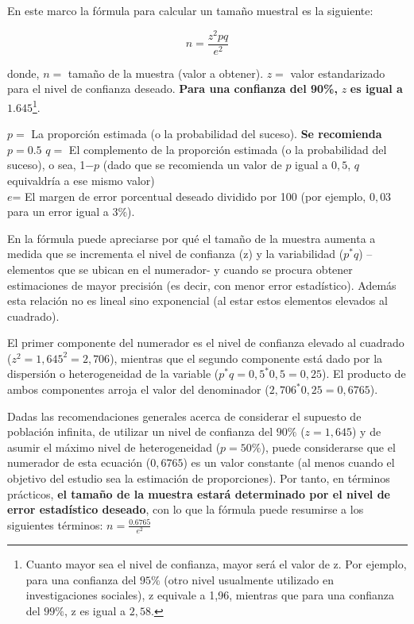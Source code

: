\documentclass[
]{book}
\begin{document}
En este marco la fórmula para calcular un tamaño muestral es la siguiente:

\[n = \frac{z^2pq}{e^2}\]

donde, \(n=\) tamaño de la muestra (valor a obtener). \(z=\) valor estandarizado para el nivel de confianza deseado. \textbf{Para una confianza del 90\%,} \(z\) \textbf{es igual a} \(1.645\)\footnote{Cuanto mayor sea el nivel de confianza, mayor será el valor de z. Por ejemplo, para una confianza del \(95\%\) (otro nivel usualmente utilizado en investigaciones sociales), z equivale a 1,96, mientras que para una confianza del \(99\%\), z es igual a \(2,58\).}.

\(p=\) La proporción estimada (o la probabilidad del suceso). \textbf{Se recomienda} \(p=0.5\) \(q=\) El complemento de la proporción estimada (o la probabilidad del suceso), o sea, 1\(-p\) (dado que se recomienda un valor de \(p\) igual a \(0,5\), \(q\) equivaldría a ese mismo valor)\\
\(e\)= El margen de error porcentual deseado dividido por 100 (por ejemplo, \(0,03\) para un error igual a \(3\%\)).

\hfill\break
En la fórmula puede apreciarse por qué el tamaño de la muestra aumenta a medida que se incrementa el nivel de confianza (z) y la variabilidad (\(p^*q\)) --elementos que se ubican en el numerador- y cuando se procura obtener estimaciones de mayor precisión (es decir, con menor error estadístico). Además esta relación no es lineal sino exponencial (al estar estos elementos elevados al cuadrado).

El primer componente del numerador es el nivel de confianza elevado al cuadrado (\(z^2=1,645^2=2,706\)), mientras que el segundo componente está dado por la dispersión o heterogeneidad de la variable (\(p^*q=0,5^*0,5=0,25\)). El producto de ambos componentes arroja el valor del denominador (\(2,706^*0,25=0,6765\)).

Dadas las recomendaciones generales acerca de considerar el supuesto de población infinita, de utilizar un nivel de confianza del \(90\%\) (\(z=1,645\)) y de asumir el máximo nivel de heterogeneidad (\(p=50\%\)), puede considerarse que el numerador de esta ecuación (\(0,6765\)) es un valor constante (al menos cuando el objetivo del estudio sea la estimación de proporciones). Por tanto, en términos prácticos, \textbf{el tamaño de la muestra estará determinado por el nivel de error estadístico deseado}, con lo que la fórmula puede resumirse a los siguientes términos: \(n = \frac{0.6765}{e^2}\)
\end{document}
